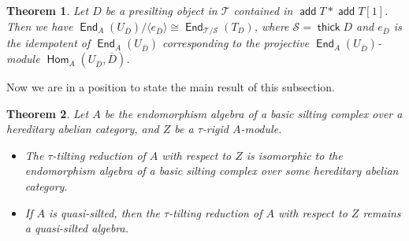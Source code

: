 \documentclass[12pt,a4paper,reqno]{amsart}
\newtheorem{theorem}{Theorem}[section]
\theoremstyle{definition}
\newcommand{\opname}[1]{\operatorname{\mathsf{#1}}}
\newcommand{\add}{\opname{add}\nolimits}
\newcommand{\thick}{\opname{thick}}
\newcommand{\Hom}{\opname{Hom}}
\newcommand{\End}{\opname{End}}
\begin{document}
\begin{theorem}\cite[Theorem 4.12 (a)]{J} \label{t: tau-tilt red and silt red} Let $D$ be a presilting object in $\mathcal{T}$ contained in $\add T * \add T[1]$. Then we have $\End_A (U_{\overline{D}}) / \langle e_{\overline{D}} \rangle \cong \End_{\mathcal{T}/\mathcal{S}} (T_D)$, where $\mathcal{S} = \thick D$ and $e_{\overline{D}}$ is the idempotent of $\End_A (U_{\overline{D}})$ corresponding to the projective $\End_A (U_{\overline{D}})$-module $\Hom_A (U_{\overline{D}}, \overline{D})$.
\end{theorem}


Now we are in a position to state the main result of this subsection.
\begin{theorem} \label{t: quasisilted is tau-tilting reduction closed}Let $A$ be the endomorphism algebra of a basic silting complex over a hereditary abelian category, and $Z$ be a $\tau$-rigid $A$-module.
\begin{itemize}
    \item[(a)] The $\tau$-tilting reduction of $A$ with respect to $Z$ is  isomorphic to the endomorphism algebra of a basic silting complex over some hereditary abelian category.
    \item[(b)] If $A$ is quasi-silted, then the $\tau$-tilting reduction of $A$ with respect to $Z$ remains a quasi-silted algebra.
\end{itemize}
\end{theorem}
\end{document}
